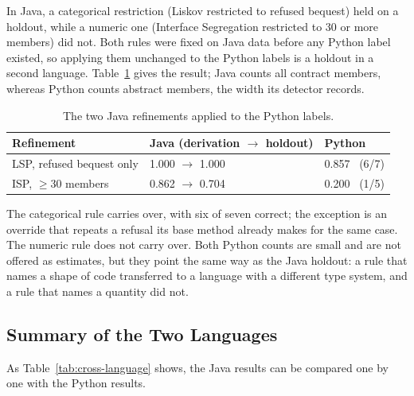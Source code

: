 In Java, a categorical restriction (Liskov restricted to refused bequest) held on a holdout, while a
numeric one (Interface Segregation restricted to 30 or more members) did not. Both rules were fixed
on Java data before any Python label existed, so applying them unchanged to the Python labels is a
holdout in a second language. Table~\ref{tab:py-refinements} gives the result; Java counts all contract
members, whereas Python counts abstract members, the width its detector records.

\begin{table}[htb]
\centering
\caption{The two Java refinements applied to the Python labels.}
\label{tab:py-refinements}
\begin{tabular}{@{}lll@{}}
\toprule
\textbf{Refinement} & \textbf{Java (derivation $\rightarrow$ holdout)} & \textbf{Python} \\
\midrule
LSP, refused bequest only & 1.000 $\rightarrow$ 1.000 & 0.857 \ (6/7) \\
ISP, $\geq$30 members & 0.862 $\rightarrow$ 0.704 & 0.200 \ (1/5) \\
\bottomrule
\end{tabular}
\end{table}

The categorical rule carries over, with six of seven correct; the exception is an override that
repeats a refusal its base method already makes for the same case. The numeric rule does not carry
over. Both Python counts are small and are not offered as estimates, but they point the same way as
the Java holdout: a rule that names a shape of code transferred to a language with a different type
system, and a rule that names a quantity did not.

\subsection{Summary of the Two Languages}
\label{sec:python-summary}

As Table~\ref{tab:cross-language} shows, the Java results can be compared one by one with the
Python results.

